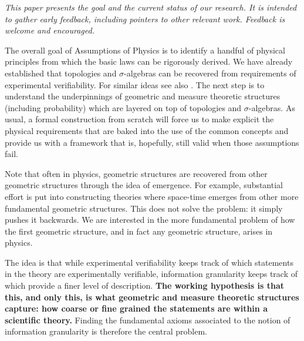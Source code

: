 \documentclass[10pt, onecolumn, longbibliography, nofootinbib]{revtex4-2}
\begin{document}
\emph{This paper presents the goal and the current status of our research. It is intended to gather early feedback, including pointers to other relevant work. Feedback is welcome and encouraged.}

The overall goal of Assumptions of Physics is to identify a handful of physical principles from which the basic laws can be rigorously derived. We have already established that topologies and $\sigma$-algebras can be recovered from requirements of experimental verifiability.\cite{aop-book,aop-overview-verifiability,aop-math-topologydistinguishability} For similar ideas see also \cite{kelly1996logic}. The next step is to understand the underpinnings of geometric and measure theoretic structures (including probability) which are layered on top of topologies and $\sigma$-algebras. As usual, a formal construction from scratch will force us to make explicit the physical requirements that are baked into the use of the common concepts and provide us with a framework that is, hopefully, still valid when those assumptions fail.

Note that often in physics, geometric structures are recovered from other geometric structures through the idea of emergence. For example, substantial effort is put into constructing theories where space-time emerges from other more fundamental geometric structures. This does not solve the problem: it simply pushes it backwards. We are interested in the more fundamental problem of how the first geometric structure, and in fact any geometric structure, arises in physics.

The idea is that while experimental verifiability keeps track of which statements in the theory are experimentally verifiable, information granularity keeps track of which provide a finer level of description. \textbf{The working hypothesis is that this, and only this, is what geometric and measure theoretic structures capture: how coarse or fine grained the statements are within a scientific theory.} Finding the fundamental axioms associated to the notion of information granularity is therefore the central problem.
\end{document}
